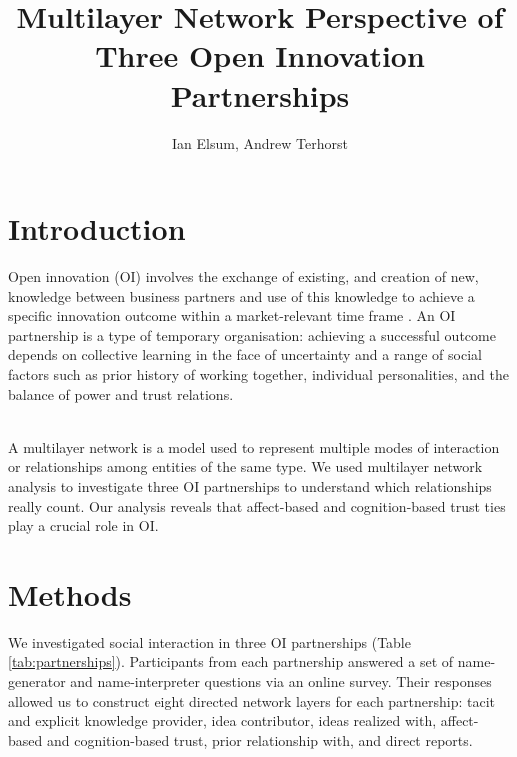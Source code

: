 \documentclass[final]{beamer}
\title
[Sunbelt 2022 Conference, Cairns, Australia] %
{ %
Multilayer Network Perspective of Three Open Innovation Partnerships
}
\author{ %
Ian Elsum\inst{1,3}, Andrew Terhorst\inst{2}
}
\institute
[Very Large University] %
{
\inst{1} Swinburne University of Technology, Melbourne, Australia\\[0.3ex]
\inst{2} Commonwealth Scientific and Industrial Research Organisation, Hobart, Australia\\[0.3ex]
\inst{3} Australian National University, Canberra, Australia
}
\begin{document}
\begin{frame}[t]
\begin{multicols}{3}

\section{Introduction}

Open innovation (OI) involves the exchange of existing, and creation of new, knowledge between business partners and use of this knowledge to achieve a specific innovation outcome within a market-relevant time frame \cite{chesbrough2018value}. An OI partnership is a type of temporary organisation: achieving a successful outcome depends on collective learning in the face of uncertainty and a range of social factors such as prior history of working together, individual personalities, and the balance of power and trust relations.\\~\

A multilayer network is a model used to represent multiple modes of interaction or relationships among entities of the same type. We used multilayer network analysis to investigate three OI partnerships to understand which relationships really count. Our analysis reveals that affect-based and cognition-based trust ties play a crucial role in OI. 

\section{Methods}

We investigated social interaction in three OI partnerships (Table \ref{tab:partnerships}). Participants from each partnership answered a set of name-generator and name-interpreter questions via an online survey. Their responses allowed us to construct eight directed network layers for each partnership: tacit and explicit knowledge provider, idea contributor, ideas realized with, affect-based and cognition-based trust, prior relationship with, and direct reports.


\end{multicols}
\end{frame}
\end{document}
